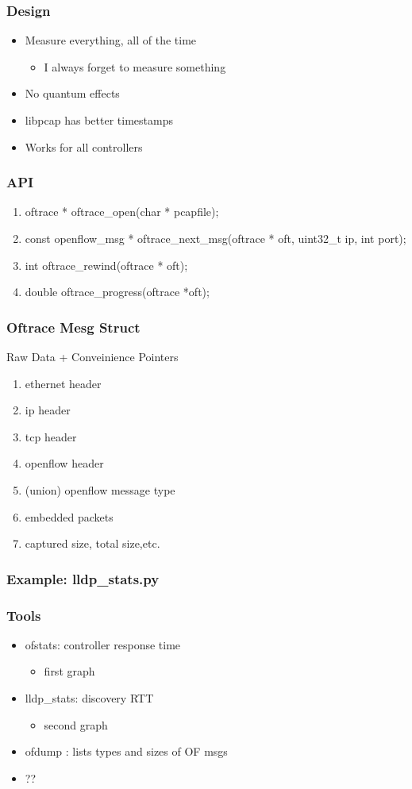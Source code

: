 \documentclass[14pt]{beamer}
\newcommand{\subbullet}[1]{\begin{itemize}\item #1\end{itemize}}
\begin{document}
\begin{frame}
\frametitle{Design}
\begin{itemize}
\item Measure everything, all of the time
\subbullet{I always forget to measure {\red something}}
\item No quantum effects
\item libpcap has better timestamps
\item Works for all controllers
\end{itemize}
\end{frame}
\begin{frame}
\frametitle{API}
\begin{enumerate}
\item oftrace * {\blue oftrace\_open}(char * pcapfile);
\item const openflow\_msg * {\blue oftrace\_next\_msg}(oftrace * oft, uint32\_t ip, int port);
\item int {\blue oftrace\_rewind}(oftrace * oft);
\item double {\blue oftrace\_progress}(oftrace *oft);
\end{enumerate}
\end{frame}
\begin{frame}
\frametitle{Oftrace Mesg Struct}
Raw Data + Conveinience Pointers
\begin{enumerate}
\item ethernet header
\item ip header
\item tcp header
\item openflow header
\item (union) openflow message type
\item embedded packets
\item captured size, total size,etc.
\end{enumerate}
\end{frame}
\begin{frame}
\frametitle{Example: lldp\_stats.py}
\end{frame}
\begin{frame}
\frametitle{Tools}
\begin{itemize}
\item ofstats: controller response time
\subbullet{first graph}
\item lldp\_stats: discovery RTT
\subbullet{second graph}
\item ofdump : lists types and sizes of OF msgs
\item ??
\end{itemize}
\end{frame}
\end{document}
